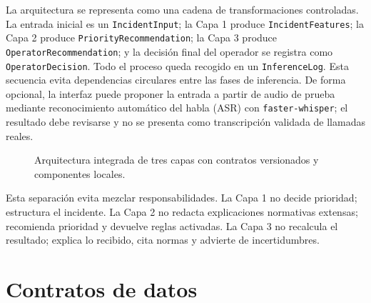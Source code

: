 La arquitectura se representa como una cadena de transformaciones controladas. La entrada inicial es un \texttt{IncidentInput}; la Capa 1 produce \texttt{IncidentFeatures}; la Capa 2 produce \texttt{PriorityRecommendation}; la Capa 3 produce \texttt{OperatorRecommendation}; y la decisión final del operador se registra como \texttt{OperatorDecision}. Todo el proceso queda recogido en un \texttt{InferenceLog}. Esta secuencia evita dependencias circulares entre las fases de inferencia. De forma opcional, la interfaz puede proponer la entrada a partir de audio de prueba mediante reconocimiento automático del habla (ASR) con \texttt{faster-whisper}; el resultado debe revisarse y no se presenta como transcripción validada de llamadas reales.

\begin{figure}[htbp]
\centering
\small
{}
\caption{Arquitectura integrada de tres capas con contratos versionados y componentes locales.}
\label{fig:flujo-logico-sistema}
\end{figure}

Esta separación evita mezclar responsabilidades. La Capa 1 no decide prioridad; estructura el incidente. La Capa 2 no redacta explicaciones normativas extensas; recomienda prioridad y devuelve reglas activadas. La Capa 3 no recalcula el resultado; explica lo recibido, cita normas y advierte de incertidumbres.

\section{Contratos de datos}

